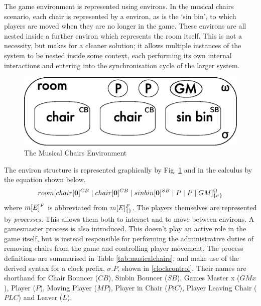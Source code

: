 The game environment is represented using environs.  In the musical
chairs scenario, each chair is represented by a environ, as is the `sin
bin', to which players are moved when they are no longer in the game.
These environs are all nested inside a further environ which represents
the room itself.  This is not a necessity, but makes for a cleaner
solution; it allows multiple instances of the system to be nested inside
some context, each performing its own internal interactions and entering
into the synchronisation cycle of the larger system.

\begin{figure}  
  \centering
  \includegraphics[scale=0.5]{gameenvbw}
  \caption{The Musical Chairs Environment}
  \label{fig:gameenv}
\end{figure}

The environ structure is represented graphically by Fig. \ref{fig:gameenv}
and in the calculus by the equation shown below.
\begin{equation}
{room}[ {chair}[ \textbf{0} ]^{CB} \;|\; {chair}[ \textbf{0} ]^{CB}
\;|\; {sinbin}[ \textbf{0} ]^{SB} \;|\; P \;|\; P \;|\; GM ]^{\Omega}_{\{\sigma\}}
\end{equation}
where ${m}[ E ]^{F}$ is abbreviated from ${m}[ E ]^{F}_{\{\}}$.  The
players themselves are represented by \emph{processes}.  This allows
them both to interact and to move between environs.  A gamesmaster
process is also introduced.  This doesn't play an active role in the
game itself, but is instead responsible for performing the
administrative duties of removing chairs from the game and controlling
player movement.  The process definitions are summarised in Table
\ref{tab:musicalchairs}, and make use of the derived syntax for a
clock prefix, $\sigma.P$, shown in \ref{clockcontrol}.  Their names
are shorthand for Chair Bouncer ($CB$), Sinbin Bouncer ($SB$), Games
Master x ($GMx$), Player ($P$), Moving Player ($MP$), Player in Chair
($PiC$), Player Leaving Chair ($PLC$) and Leaver ($L$).

